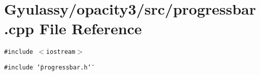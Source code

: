 \section{Gyulassy/opacity3/src/progressbar.cpp File Reference}
\label{progressbar_8cpp}
{\tt \#include $<$iostream$>$}\par
{\tt \#include \char`\"{}progressbar.h\char`\"{}}\par
